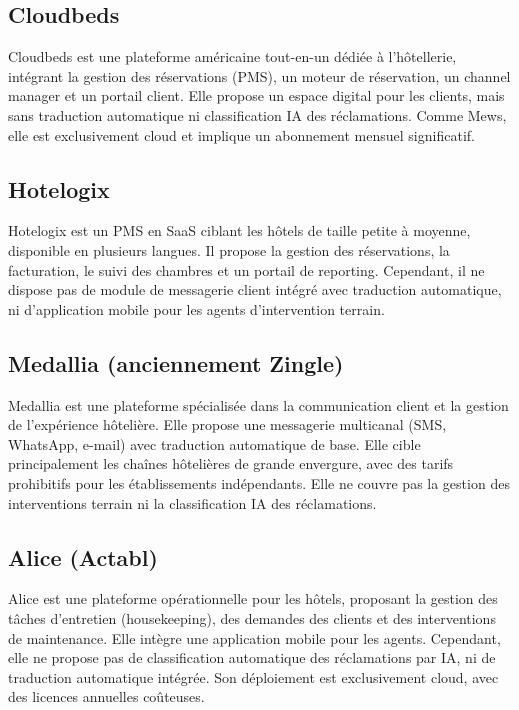 \subsection{Cloudbeds}

Cloudbeds est une plateforme américaine tout-en-un dédiée à l'hôtellerie, intégrant la gestion des réservations (PMS), un moteur de réservation, un channel manager et un portail client. Elle propose un espace digital pour les clients, mais sans traduction automatique ni classification IA des réclamations. Comme Mews, elle est exclusivement cloud et implique un abonnement mensuel significatif.

\subsection{Hotelogix}

Hotelogix est un PMS en SaaS ciblant les hôtels de taille petite à moyenne, disponible en plusieurs langues. Il propose la gestion des réservations, la facturation, le suivi des chambres et un portail de reporting. Cependant, il ne dispose pas de module de messagerie client intégré avec traduction automatique, ni d'application mobile pour les agents d'intervention terrain.

\subsection{Medallia (anciennement Zingle)}

Medallia est une plateforme spécialisée dans la communication client et la gestion de l'expérience hôtelière. Elle propose une messagerie multicanal (SMS, WhatsApp, e-mail) avec traduction automatique de base. Elle cible principalement les chaînes hôtelières de grande envergure, avec des tarifs prohibitifs pour les établissements indépendants. Elle ne couvre pas la gestion des interventions terrain ni la classification IA des réclamations.

\subsection{Alice (Actabl)}

Alice est une plateforme opérationnelle pour les hôtels, proposant la gestion des tâches d'entretien (housekeeping), des demandes des clients et des interventions de maintenance. Elle intègre une application mobile pour les agents. Cependant, elle ne propose pas de classification automatique des réclamations par IA, ni de traduction automatique intégrée. Son déploiement est exclusivement cloud, avec des licences annuelles coûteuses.

